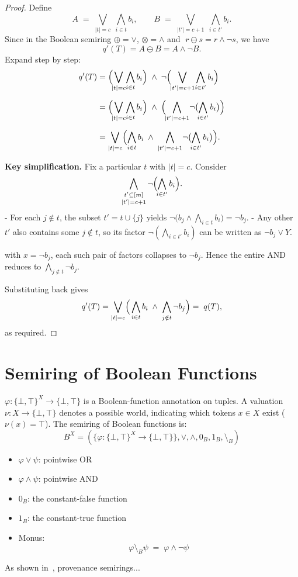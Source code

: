 \documentclass[10pt,a4paper]{scrartcl}
\theoremstyle{definition}
\theoremstyle{remark}
\begin{document}
\begin{proof}
Define
\[
A \;=\; \bigvee_{\lvert t\rvert = c}\;\bigwedge_{i\in t} b_i,
\qquad
B \;=\; \bigvee_{\lvert t'\rvert = c+1}\;\bigwedge_{i\in t'} b_i.
\]
Since in the Boolean semiring \(\oplus=\vee\), \(\otimes=\wedge\) and
\(\;r\ominus s = r\wedge\neg s\), we have
\[
q'(T)
= A \ominus B
= A \wedge \neg B.
\]
Expand step by step:
\begin{align*}
q'(T)
&= \Bigl(\!\bigvee_{\lvert t\rvert = c}\!\bigwedge_{i\in t}b_i\Bigr)
   \;\wedge\;
   \neg\Bigl(\!\bigvee_{\lvert t'\rvert = c+1}\!\bigwedge_{i\in t'}b_i\Bigr)\\[6pt]
&= \Bigl(\!\bigvee_{\lvert t\rvert = c}\!\bigwedge_{i\in t}b_i\Bigr)
   \;\wedge\;
   \Bigl(\!\bigwedge_{\lvert t'\rvert = c+1}\!\neg\bigl(\!\bigwedge_{i\in t'}b_i\bigr)\Bigr)\\[6pt]
&= \bigvee_{\lvert t\rvert = c}
    \Bigl(
      \bigwedge_{i\in t}b_i
      \;\wedge\;
      \bigwedge_{|t'|=c+1}\!\neg\bigl(\!\bigwedge_{i\in t'}b_i\bigr)
    \Bigr).
\end{align*}

\textbf{Key simplification.}  Fix a particular \(t\) with \(\lvert t\rvert=c\).  Consider
\[
\bigwedge_{\substack{t'\subseteq[m]\\|t'|=c+1}}
\neg\Bigl(\!\bigwedge_{i\in t'}b_i\Bigr).
\]
- For each \(j\notin t\), the subset \(t'=t\cup\{j\}\) yields
  \(\neg\bigl(b_j\wedge\bigwedge_{i\in t}b_i\bigr)=\neg b_j\).  
- Any other \(t'\) also contains some \(j\notin t\), so its factor
  \(\neg(\bigwedge_{i\in t'}b_i)\) can be written as
  \(\neg b_j\vee Y\).  

with \(x=\neg b_j\), each such pair of factors collapses to \(\neg b_j\).  Hence the entire
AND reduces to
\(\bigwedge_{j\notin t}\neg b_j\).

Substituting back gives
\[
q'(T)
=\bigvee_{\lvert t\rvert = c}
\Bigl(\,\bigwedge_{i\in t}b_i
       \;\wedge\;
       \bigwedge_{j\notin t}\neg b_j
\Bigr)
=\;q(T),
\]
as required.
\end{proof}
\section{Semiring of Boolean Functions}

\(\varphi\colon \{\bot,\top\}^X \to \{\bot,\top\}\) is a Boolean-function annotation on tuples.
A valuation \(\nu\colon X \to \{\bot,\top\}\) denotes a possible world,
  indicating which tokens \(x\in X\) exist (\(\nu(x)=\top\)).
The semiring of Boolean functions is:
$$
B^X = (\{\varphi : \{ \bot,\top \}^X \to \{\bot,\top\}\},\vee,\wedge,0_B,1_B,\setminus_B)
$$
\begin{itemize}
    \item \(\varphi \vee \psi\): pointwise OR
    \item \(\varphi \wedge \psi\): pointwise AND
    \item \(0_B\): the constant-false function
    \item \(1_B\): the constant-true function
    \item Monus:
        $$
        \varphi \setminus_B \psi \;=\; \varphi \wedge \neg \psi
        $$
\end{itemize}



As shown in~\cite{amsterdamer2011provenance}, provenance semirings...



\end{document}
